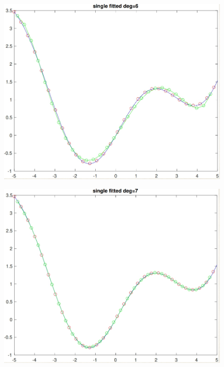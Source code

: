\documentclass[11pt]{article}
\begin{document}
\begin{figure}[h!]
\centering\includegraphics[scale=0.3]{clean_poly_d_6.png}
\end{figure}


\begin{figure}[h!]
\centering\includegraphics[scale=0.3]{clean_poly_d_7.png}
\end{figure}
\end{document}
